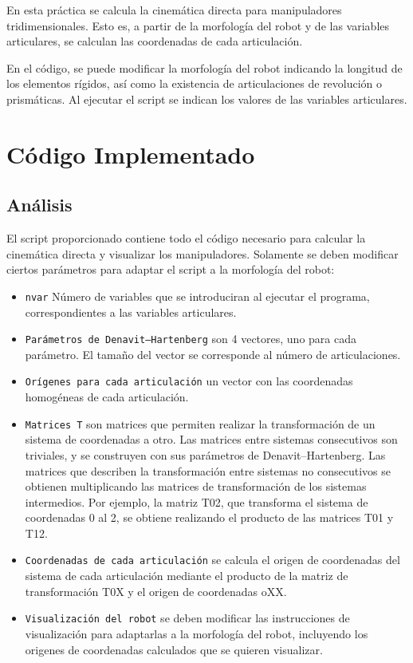 En esta práctica se calcula la cinemática directa para manipuladores tridimensionales. 
Esto es, a partir de la morfología del robot y de las variables articulares, se calculan las coordenadas de cada articulación.

\bigskip En el código, se puede modificar la morfología del robot indicando la longitud de los elementos rígidos, así como la existencia de articulaciones de revolución o prismáticas.
Al ejecutar el script se indican los valores de las variables articulares.

\section{Código Implementado}
\subsection{Análisis}
El script proporcionado contiene todo el código necesario para calcular la cinemática directa y visualizar los manipuladores. 
Solamente se deben modificar ciertos parámetros para adaptar el script a la morfología del robot:
\begin{itemize}
   \item \texttt{nvar} Número de variables que se introduciran al ejecutar el programa, correspondientes a las variables articulares.
   \item \texttt{Parámetros de Denavit–Hartenberg} son 4 vectores, uno para cada parámetro. El tamaño del vector se corresponde al número de articulaciones.
   \item \texttt{Orígenes para cada articulación} un vector con las coordenadas homogéneas de cada articulación.
   \item \texttt{Matrices T} son matrices que permiten realizar la transformación de un sistema de coordenadas a otro.
   Las matrices entre sistemas consecutivos son triviales, y se construyen con sus parámetros de Denavit–Hartenberg.
   Las matrices que describen la transformación entre sistemas no consecutivos se obtienen multiplicando las matrices de transformación de los sistemas intermedios.
   Por ejemplo, la matriz T02, que transforma el sistema de coordenadas 0 al 2, se obtiene realizando el producto de las matrices T01 y T12.
   \item \texttt{Coordenadas de cada articulación} se calcula el origen de coordenadas del sistema de cada articulación mediante el producto de la matriz de transformación T0X y el origen de coordenadas oXX.
   \item \texttt{Visualización del robot} se deben modificar las instrucciones de visualización para adaptarlas a la morfología del robot, incluyendo los origenes de coordenadas calculados que se quieren visualizar.
\end{itemize}

